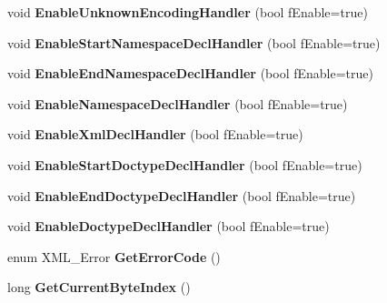 \begin{DoxyCompactItemize}
\item 
\hypertarget{class_c_expat_impl_a784e4d39f69b56f02d3e2a85eaeb641b}{void {\bfseries Enable\+Unknown\+Encoding\+Handler} (bool f\+Enable=true)}\label{class_c_expat_impl_a784e4d39f69b56f02d3e2a85eaeb641b}

\item 
\hypertarget{class_c_expat_impl_ac675f52624f52b3cdaa57b86d97d7f51}{void {\bfseries Enable\+Start\+Namespace\+Decl\+Handler} (bool f\+Enable=true)}\label{class_c_expat_impl_ac675f52624f52b3cdaa57b86d97d7f51}

\item 
\hypertarget{class_c_expat_impl_ae3938fc6542d2f56c88934dd4d7c70ee}{void {\bfseries Enable\+End\+Namespace\+Decl\+Handler} (bool f\+Enable=true)}\label{class_c_expat_impl_ae3938fc6542d2f56c88934dd4d7c70ee}

\item 
\hypertarget{class_c_expat_impl_a7b3c35dc2f667aa146f346a2b437bd54}{void {\bfseries Enable\+Namespace\+Decl\+Handler} (bool f\+Enable=true)}\label{class_c_expat_impl_a7b3c35dc2f667aa146f346a2b437bd54}

\item 
\hypertarget{class_c_expat_impl_afffef6ef64c80c88786cf06b4ba9e776}{void {\bfseries Enable\+Xml\+Decl\+Handler} (bool f\+Enable=true)}\label{class_c_expat_impl_afffef6ef64c80c88786cf06b4ba9e776}

\item 
\hypertarget{class_c_expat_impl_a1294cb39e231da87e282eb84196c8785}{void {\bfseries Enable\+Start\+Doctype\+Decl\+Handler} (bool f\+Enable=true)}\label{class_c_expat_impl_a1294cb39e231da87e282eb84196c8785}

\item 
\hypertarget{class_c_expat_impl_a6fcf5de29a3e7a3da9ca655eb91b115c}{void {\bfseries Enable\+End\+Doctype\+Decl\+Handler} (bool f\+Enable=true)}\label{class_c_expat_impl_a6fcf5de29a3e7a3da9ca655eb91b115c}

\item 
\hypertarget{class_c_expat_impl_a267c2e407879948b0b3910ccc84e7815}{void {\bfseries Enable\+Doctype\+Decl\+Handler} (bool f\+Enable=true)}\label{class_c_expat_impl_a267c2e407879948b0b3910ccc84e7815}

\item 
\hypertarget{class_c_expat_impl_aeb0f6e67c9ab6fdfeb299f48d8445837}{enum X\+M\+L\+\_\+\+Error {\bfseries Get\+Error\+Code} ()}\label{class_c_expat_impl_aeb0f6e67c9ab6fdfeb299f48d8445837}

\item 
\hypertarget{class_c_expat_impl_ab19268d1441402b98ec8ccab31cb2015}{long {\bfseries Get\+Current\+Byte\+Index} ()}\label{class_c_expat_impl_ab19268d1441402b98ec8ccab31cb2015}


\end{DoxyCompactItemize}
